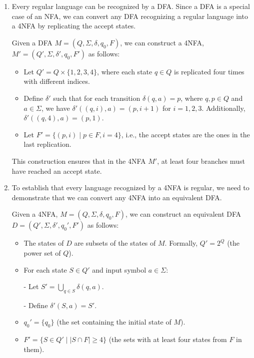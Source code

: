 \documentclass[letterpaper,12pt]{article}
\newcounter{problemid}
\def\newproblem{\clearpage\newpage{\bf Problem~\arabic{problemid}\stepcounter{problemid}}\hfill\par}
\begin{document}
\newproblem
\begin{enumerate}
    \item Every regular language can be recognized by a DFA. Since a DFA is a special case of an NFA, we can convert any DFA recognizing a regular language into a 4NFA by replicating the accept states.

    Given a DFA \(M = (Q, \Sigma, \delta, q_0, F)\), we can construct a 4NFA, \(M' = (Q', \Sigma, \delta', q_0, F')\) as follows:
    
    \begin{itemize}
        \item Let \(Q' = Q \times \{1, 2, 3, 4\}\), where each state \(q \in Q\) is replicated four times with different indices.
        \item Define \(\delta'\) such that for each transition \(\delta(q, a) = p\), where \(q, p \in Q\) and \(a \in \Sigma\), we have \(\delta'((q, i), a) = (p, i+1)\) for \(i = 1, 2, 3\). Additionally, \(\delta'((q, 4), a) = (p, 1)\).
        \item Let \(F' = \{(p, i) \mid p \in F, i = 4\}\), i.e., the accept states are the ones in the last replication.
    \end{itemize}
    
    This construction ensures that in the 4NFA \(M'\), at least four branches must have reached an accept state.

    \item 

    To establish that every language recognized by a 4NFA is regular, we need to demonstrate that we can convert any 4NFA into an equivalent DFA.
    
    Given a 4NFA, \(M = (Q, \Sigma, \delta, q_0, F)\), we can construct an equivalent DFA \(D = (Q', \Sigma, \delta', q_0', F')\) as follows:
    
    \begin{itemize}
        \item The states of \(D\) are subsets of the states of \(M\). Formally, \(Q' = 2^Q\) (the power set of \(Q\)).
        \item For each state \(S \in Q'\) and input symbol \(a \in \Sigma\):
        
            - Let \(S' = \bigcup_{q \in S} \delta(q, a)\).
            
            - Define \(\delta'(S, a) = S'\).
        \item \(q_0' = \{q_0\}\) (the set containing the initial state of \(M\)).
        \item \(F' = \{S \in Q' \mid |S \cap F| \geq 4\}\) (the sets with at least four states from \(F\) in them).
    \end{itemize}


\end{enumerate}
\end{document}
